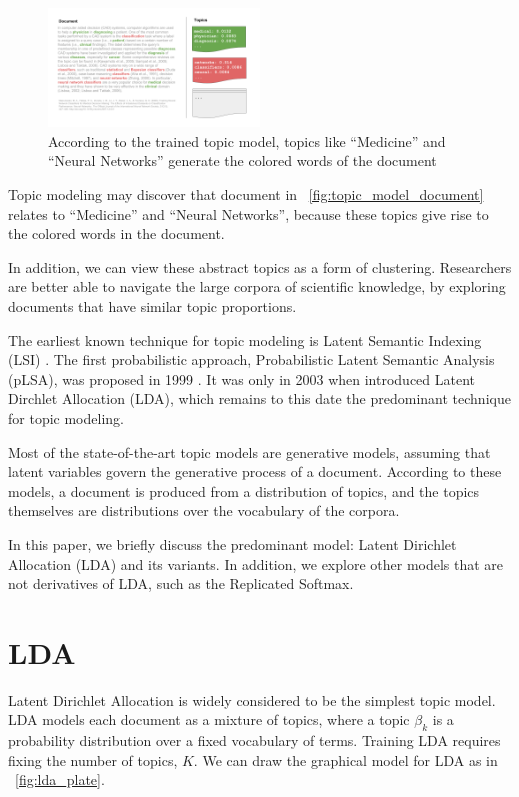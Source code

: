 \documentclass[letterpaper]{article}
\begin{document}
\begin{figure}[ht]
  \centering
  \includegraphics[width=0.5\textwidth]{topic_models.png}
  \caption{\label{fig:topic_model_document} According to the trained
    topic model, topics like ``Medicine'' and ``Neural Networks''
    generate the colored words of the document}
\end{figure}

Topic modeling may discover that document in
~\autoref{fig:topic_model_document} relates to ``Medicine'' and
``Neural Networks'', because these topics give rise to the colored
words in the document.

In addition, we can view these abstract topics as a form of clustering.
Researchers are better able to navigate the large corpora of
scientific knowledge, by exploring documents that have similar topic
proportions.

The earliest known technique for topic modeling is Latent Semantic
Indexing (LSI) \cite{deerwester1990indexing}. The first probabilistic
approach, Probabilistic Latent Semantic Analysis (pLSA), was proposed
in 1999 \cite{hofmann1999probabilistic}. It was only in 2003 when
\citeauthor{blei2003latent} introduced Latent Dirchlet Allocation
(LDA), which remains to this date the predominant technique for topic
modeling.

Most of the state-of-the-art topic models are generative models,
assuming that latent variables govern the generative process of a
document. According to these models, a document is produced from a
distribution of topics, and the topics themselves are distributions
over the vocabulary of the corpora.

In this paper, we briefly discuss the predominant model: Latent
Dirichlet Allocation (LDA) and its variants. In addition, we explore
other models that are not derivatives of LDA, such as the Replicated
Softmax.

\section{LDA}
Latent Dirichlet Allocation is widely considered to be the simplest
topic model. LDA models each document as a mixture of topics, where a
topic $\beta_k$ is a probability distribution over a fixed vocabulary
of terms. Training LDA requires fixing the number of topics, $K$.
We can draw the graphical model for LDA as in
~\autoref{fig:lda_plate}.
\end{document}
